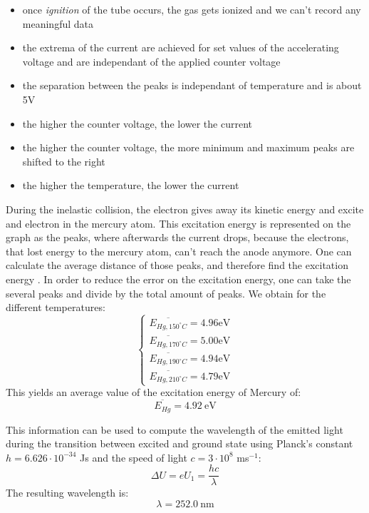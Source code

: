 \documentclass{scrartcl}
\begin{document}
\FloatBarrier

\begin{itemize}
    \item once \textit{ignition} of the tube occurs, the gas gets ionized and we can't record any meaningful data
    \item the extrema of the current are achieved for set values of the accelerating voltage and are independant of the applied counter voltage
    \item the separation between the peaks is independant of temperature and is about 5V
    \item the higher the counter voltage, the lower the current 
    \item the higher the counter voltage, the more minimum and maximum peaks are shifted to the right
    \item the higher the temperature, the lower the current
\end{itemize}

\noindent During the inelastic collision, the electron gives away its kinetic energy and excite and electron in the mercury atom. This excitation energy is represented on the graph as the peaks, where afterwards the current drops, because the electrons, that lost energy to the mercury atom, can't reach the anode anymore.
One can calculate the average distance of those peaks, and therefore find the excitation energy .
In order to reduce the error on the excitation energy, one can take the several peaks and divide by the total amount of peaks. We obtain for the different temperatures: \[\begin{cases}
    \overline{E_{Hg,150^{\circ} C}} = 4.96 \text{eV} \\
    \overline{E_{Hg,170^{\circ} C}} = 5.00 \text{eV} \\
    \overline{E_{Hg,190^{\circ} C}} = 4.94 \text{eV} \\
    \overline{E_{Hg,210^{\circ} C}} = 4.79 \text{eV} 
\end{cases}\] This yields an average value of the excitation energy of Mercury of: \[ \boxed{\overline{E_{Hg}}=4.92 \ \text{eV}}\]

\noindent This information can be used to compute the wavelength of the emitted light during the transition between excited and ground state using Planck’s constant $h= 6.626 \cdot 10^{-34}$ Js and the speed of light $c = 3 \cdot 10^8$ ms$^{-1}$:
$$\Delta U = eU_1 = \frac{hc}{\lambda}$$
The resulting wavelength is: \[\boxed{\lambda = 252.0 \ \text{nm}}\]
\end{document}
